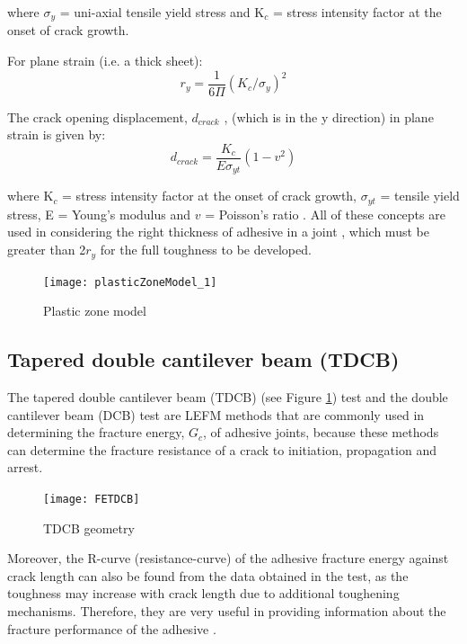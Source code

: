 \documentclass[numbers=noendperiod,chapterprefix=on]{icldt} %
\begin{document}
where $ \sigma_y $ = uni-axial tensile yield stress and K$_{c}$ = stress intensity factor at the onset of crack growth.

For plane strain (i.e. a thick sheet):
\begin{equation} \label{ry plane strain}
r_y=\frac{1}{6\Pi}(K_c/\sigma_y)^2
\end{equation}

The crack opening displacement, $d_{crack}$ \cite{Bandyopadhyay1990a}, (which is in the y direction) in plane strain is given by: 
\begin{equation} \label{Crack_opening_displacement}
d_{crack}=\frac{K_c}{E \sigma _{yt}}(1-v^{2})
\end{equation} 

where K$_{c}$ = stress intensity factor at the onset of crack growth, $\sigma_{yt}$ = tensile yield stress, E = 
Young's modulus and $ v $ = Poisson's ratio \cite{Hsieh2011}.
All of these concepts are used in considering the right thickness of adhesive in a joint \cite{Kinloch1994}, which must be greater than 2$r_y$ for the full toughness to be developed. 

\begin{figure}[!htpb]
\centering
\texttt{[image: plasticZoneModel\_1]}
\caption{Plastic zone model \cite{Kinloch1994}} 
\end{figure}

\subsection{Tapered double cantilever beam (TDCB)}

The tapered double cantilever beam (TDCB) (see Figure \ref{FETDCB_1}) test and the double cantilever beam (DCB) test are LEFM methods that are commonly used in determining the fracture energy, $G_c$, of adhesive joints, because these methods can determine the fracture resistance of a crack to initiation, propagation and arrest. 

\begin{figure}[!htpb]
\centering
\texttt{[image: FETDCB]} 
\caption{TDCB geometry \cite{Brett2011}} \label{FETDCB_1}
\end{figure}

Moreover, the R-curve (resistance-curve) of the adhesive fracture energy against crack length can also be found from the data obtained in the test, as the toughness may increase with crack length due to additional toughening mechanisms. Therefore, they are very useful in providing information about the fracture performance of the adhesive \cite{Kinloch1983,Kinloch1990}. 
\end{document}
